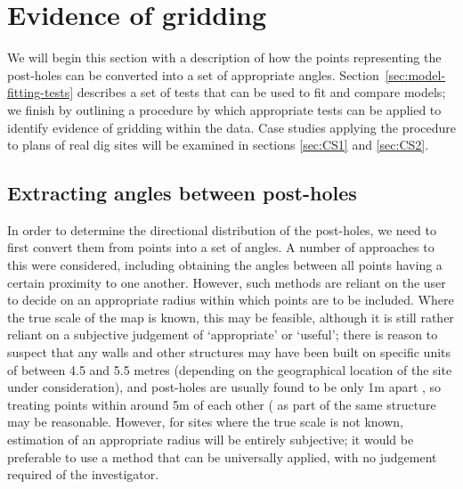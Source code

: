 \documentclass[../../ArchStats.tex]{subfiles}
\begin{document}


\section{Evidence of gridding}

We will begin this section with a description of how the points representing the post-holes can be converted into a set of appropriate angles. Section~\ref{sec:model-fitting-tests} describes a set of tests that can be used to fit and compare models; we finish by outlining a procedure by which appropriate tests can be applied to identify evidence of gridding within the data. Case studies applying the procedure to plans of real dig sites will be examined in sections \ref{sec:CS1} and \ref{sec:CS2}.


\subsection{Extracting angles between post-holes}

In order to determine the directional distribution of the post-holes, we need to first convert them from points into a set of angles. A number of approaches to this were considered, including obtaining the angles between all points having a certain proximity to one another. However, such methods are reliant on the user to decide on an appropriate radius within which points are to be included. Where the true scale of the map is known, this may be feasible, although it is still rather reliant on a subjective judgement of `appropriate' or `useful'; there is reason to suspect that any walls and other structures may have been built on specific units of between 4.5 and 5.5 metres (depending on the geographical location of the site under consideration), and post-holes are usually found to be only 1m apart , so treating points within around 5m of each other ( as part of the same structure may be reasonable. However, for sites where the true scale is not known, estimation of an appropriate radius will be entirely subjective; it would be preferable to use a method that can be universally applied, with no judgement required of the investigator.
\end{document}
